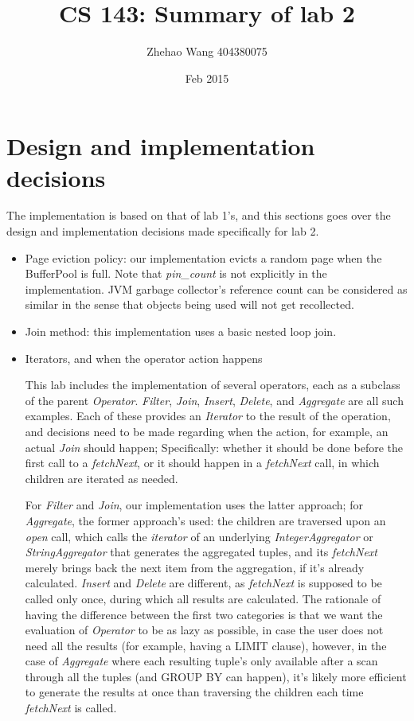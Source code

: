 \documentclass[11pt]{article}
\title{CS 143: Summary of lab 2}
\author{Zhehao Wang  404380075}
\date{Feb 2015}
\begin{document}
\maketitle

\section{Design and implementation decisions}

The implementation is based on that of lab 1's, and this sections goes over the design and implementation decisions made specifically for lab 2.

\begin{itemize}

\item{Page eviction policy: our implementation evicts a random page when the BufferPool is full. Note that \textit{pin\_count} is not explicitly in the implementation. JVM garbage collector's reference count can be considered as similar in the sense that objects being used will not get recollected.}

\item{Join method: this implementation uses a basic nested loop join.}

\item{Iterators, and when the operator action happens}

This lab includes the implementation of several operators, each as a subclass of the parent \textit{Operator}. \textit{Filter}, \textit{Join}, \textit{Insert}, \textit{Delete}, and \textit{Aggregate} are all such examples. Each of these provides an \textit{Iterator} to the result of the operation, and decisions need to be made regarding when the action, for example, an actual \textit{Join} should happen; Specifically: whether it should be done before the first call to a \textit{fetchNext}, or it should happen in a \textit{fetchNext} call, in which children are iterated as needed.

For \textit{Filter} and \textit{Join}, our implementation uses the latter approach; for \textit{Aggregate}, the former approach's used: the children are traversed upon an \textit{open} call, which calls the \textit{iterator} of an underlying \textit{IntegerAggregator} or \textit{StringAggregator} that generates the aggregated tuples, and its \textit{fetchNext} merely brings back the next item from the aggregation, if it's already calculated. \textit{Insert} and \textit{Delete} are different, as \textit{fetchNext} is supposed to be called only once, during which all results are calculated. The rationale of having the difference between the first two categories is that we want the evaluation of \textit{Operator} to be as lazy as possible, in case the user does not need all the results (for example, having a LIMIT clause), however, in the case of \textit{Aggregate} where each resulting tuple's only available after a scan through all the tuples (and GROUP BY can happen), it's likely more efficient to generate the results at once than traversing the children each time \textit{fetchNext} is called.

\end{itemize}
\end{document}
